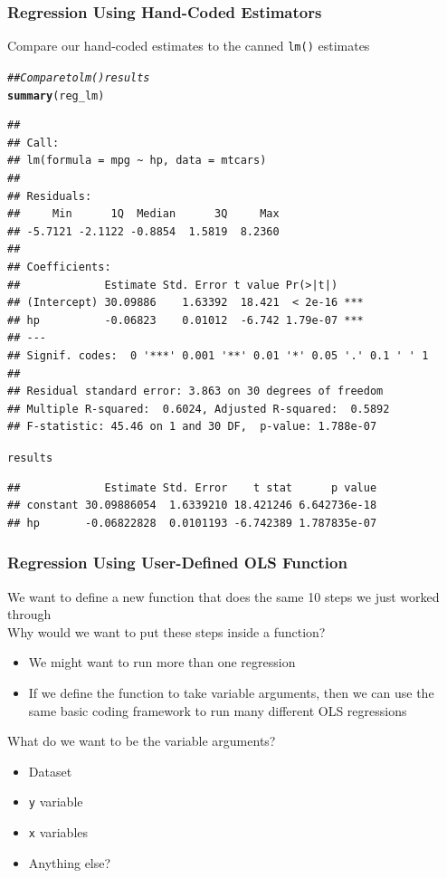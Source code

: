 \documentclass{beamer}\usepackage[]{graphicx}\usepackage[]{xcolor}
\makeatletter
\newcommand{\hlcom}[1]{\textcolor[rgb]{0.678,0.584,0.686}{\textit{#1}}}%
\newcommand{\hlstd}[1]{\textcolor[rgb]{0.345,0.345,0.345}{#1}}%
\newcommand{\hlkwd}[1]{\textcolor[rgb]{0.737,0.353,0.396}{\textbf{#1}}}%
\newenvironment{kframe}{%
 \def\at@end@of@kframe{}%
 \ifinner\ifhmode%
  \def\at@end@of@kframe{\end{minipage}}%
  \begin{minipage}{\columnwidth}%
 \fi\fi%
 \def\FrameCommand##1{\hskip\@totalleftmargin \hskip-\fboxsep
 \colorbox{shadecolor}{##1}\hskip-\fboxsep
     \hskip-\linewidth \hskip-\@totalleftmargin \hskip\columnwidth}%
 \MakeFramed {\advance\hsize-\width
   \@totalleftmargin\z@ \linewidth\hsize
   \@setminipage}}%
 {\par\unskip\endMakeFramed%
 \at@end@of@kframe}
\newenvironment{knitrout}{}{} %
\makeatother
\begin{document}
\begin{frame}[fragile]\frametitle{Regression Using Hand-Coded Estimators}
    Compare our hand-coded estimates to the canned \texttt{lm()} estimates
    \vspace{1ex}
\begin{knitrout}\tiny
{}\color{fgcolor}\begin{kframe}
\begin{alltt}
\hlcom{## Compare to lm() results}
\hlkwd{summary}\hlstd{(reg_lm)}
\end{alltt}
\begin{verbatim}
## 
## Call:
## lm(formula = mpg ~ hp, data = mtcars)
## 
## Residuals:
##     Min      1Q  Median      3Q     Max 
## -5.7121 -2.1122 -0.8854  1.5819  8.2360 
## 
## Coefficients:
##             Estimate Std. Error t value Pr(>|t|)    
## (Intercept) 30.09886    1.63392  18.421  < 2e-16 ***
## hp          -0.06823    0.01012  -6.742 1.79e-07 ***
## ---
## Signif. codes:  0 '***' 0.001 '**' 0.01 '*' 0.05 '.' 0.1 ' ' 1
## 
## Residual standard error: 3.863 on 30 degrees of freedom
## Multiple R-squared:  0.6024,	Adjusted R-squared:  0.5892 
## F-statistic: 45.46 on 1 and 30 DF,  p-value: 1.788e-07
\end{verbatim}
\begin{alltt}
\hlstd{results}
\end{alltt}
\begin{verbatim}
##             Estimate Std. Error    t stat      p value
## constant 30.09886054  1.6339210 18.421246 6.642736e-18
## hp       -0.06822828  0.0101193 -6.742389 1.787835e-07
\end{verbatim}
\end{kframe}
\end{knitrout}
\end{frame}

\begin{frame}[fragile]\frametitle{Regression Using User-Defined OLS Function}
    We want to define a new function that does the same 10 steps we just worked through \\
    \vspace{3ex}
    Why would we want to put these steps inside a function?
    \begin{itemize}
        \item We might want to run more than one regression
        \item If we define the function to take variable arguments, then we can use the same basic coding framework to run many different OLS regressions
    \end{itemize}
    \vspace{3ex}
    What do we want to be the variable arguments?
    \begin{itemize}
        \item Dataset
        \item \texttt{y} variable
        \item \texttt{x} variables
        \item Anything else?
    \end{itemize}
\end{frame}
\end{document}
